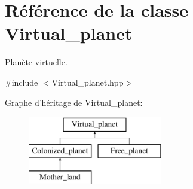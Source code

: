\hypertarget{classVirtual__planet}{\section{Référence de la classe Virtual\-\_\-planet}
\label{classVirtual__planet}
}


Planète virtuelle.  




{\ttfamily \#include $<$Virtual\-\_\-planet.\-hpp$>$}

Graphe d'héritage de Virtual\-\_\-planet\-:\begin{figure}[H]
\begin{center}
\leavevmode
\includegraphics[height=3.000000cm]{classVirtual__planet}
\end{center}
\end{figure}
